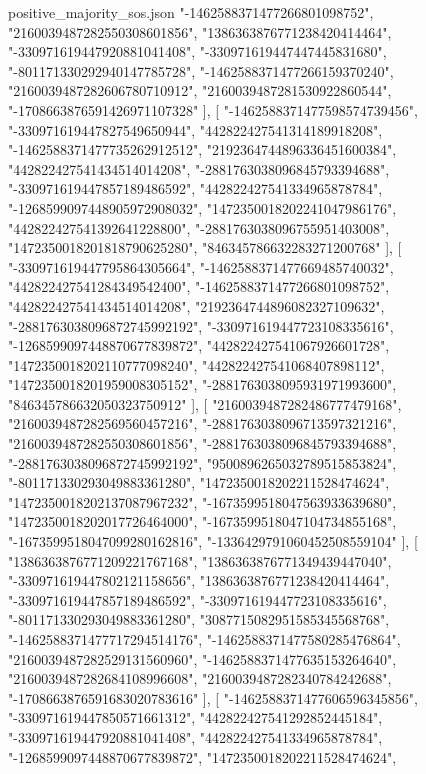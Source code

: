 \begin{filecontents*}[overwrite]{positive_majority_sos.json}
    "-1462588371477266801098752",
    "2160039487282550308601856",
    "1386363876771238420414464",
    "-330971619447920881041408",
    "-330971619447447445831680",
    "-801171330292940147785728",
    "-1462588371477266159370240",
    "2160039487282606780710912",
    "2160039487281530922860544",
    "-1708663876591426971107328"
   ],
   [
    "-1462588371477598574739456",
    "-330971619447827549650944",
    "442822427541314189918208",
    "-1462588371477735262912512",
    "2192364744896336451600384",
    "442822427541434514014208",
    "-2881763038096845793394688",
    "-330971619447857189486592",
    "442822427541334965878784",
    "-1268599097448905972908032",
    "1472350018202241047986176",
    "442822427541392641228800",
    "-2881763038096755951403008",
    "1472350018201818790625280",
    "846345786632283271200768"
   ],
   [
    "-330971619447795864305664",
    "-1462588371477669485740032",
    "442822427541284349542400",
    "-1462588371477266801098752",
    "442822427541434514014208",
    "2192364744896082327109632",
    "-2881763038096872745992192",
    "-330971619447723108335616",
    "-1268599097448870677839872",
    "442822427541067926601728",
    "1472350018202110777098240",
    "442822427541068407898112",
    "1472350018201959008305152",
    "-2881763038095931971993600",
    "846345786632050323750912"
   ],
   [
    "2160039487282486777479168",
    "2160039487282569560457216",
    "-2881763038096713597321216",
    "2160039487282550308601856",
    "-2881763038096845793394688",
    "-2881763038096872745992192",
    "9500896265032789515853824",
    "-801171330293049883361280",
    "1472350018202211528474624",
    "1472350018202137087967232",
    "-1673599518047563933639680",
    "1472350018202017726464000",
    "-1673599518047104734855168",
    "-1673599518047099280162816",
    "-1336429791060452508559104"
   ],
   [
    "1386363876771209221767168",
    "1386363876771349439447040",
    "-330971619447802121158656",
    "1386363876771238420414464",
    "-330971619447857189486592",
    "-330971619447723108335616",
    "-801171330293049883361280",
    "3087715082951585345568768",
    "-1462588371477717294514176",
    "-1462588371477580285476864",
    "2160039487282529131560960",
    "-1462588371477635153264640",
    "2160039487282684108996608",
    "2160039487282340784242688",
    "-1708663876591683020783616"
   ],
   [
    "-1462588371477606596345856",
    "-330971619447850571661312",
    "442822427541292852445184",
    "-330971619447920881041408",
    "442822427541334965878784",
    "-1268599097448870677839872",
    "1472350018202211528474624",

\end{filecontents*}

